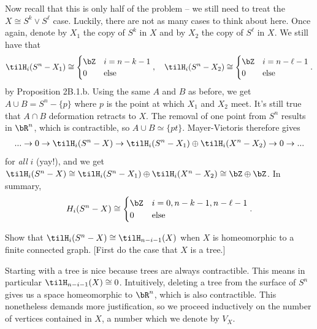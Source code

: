 \begin{homework}[e]
\begin{prf}
    Now recall that this is only half of the problem -- we still need to treat the $X \cong S^k \vee S^\ell$ case. Luckily, there are not as many cases to think about here. Once again, denote by $X_1$ the copy of $S^k$ in $X$ and by $X_2$ the copy of $S^{\ell}$ in $X$. We still have that
    \begin{align*}
      \tilH_i(S^n - X_1) \cong
      \begin{cases}
        \bZ & i = n - k - 1 \\
        0 & \text{else}
      \end{cases}, \hspace{1em}
      \tilH_i(S^n - X_2) \cong
      \begin{cases}
        \bZ & i = n - \ell - 1 \\
        0 & \text{else}
      \end{cases}.
    \end{align*}
    by Proposition 2B.1.b. Using the same $A$ and $B$ as before, we get $A\cup B = S^n - \{p\}$ where $p$ is the point at which $X_1$ and $X_2$ meet. It's still true that $A \cap B$ deformation retracts to $X$. The removal of one point from $S^n$ results in $\bR^n$, which is contractible, so $A \cup B \simeq \{pt\}$. Mayer-Vietoris therefore gives
    \begin{align*}
      ... \to 0 \to \tilH_i(S^n - X) \to \tilH_i(S^n - X_1) \oplus \tilH_i(X^n - X_2) \to 0 \to ...
    \end{align*}
    for \emph{all} $i$ (yay!), and we get $\tilH_i(S^n - X) \cong \tilH_i(S^n - X_1) \oplus \tilH_i(X^n - X_2) \cong \bZ \oplus \bZ$. In summary,
    \begin{align*}
      H_i(S^n - X) \cong
      \begin{cases}
        \bZ & i = 0, n - k - 1, n - \ell - 1 \\
        0 & \text{else}
      \end{cases}.
    \end{align*}
  \end{prf}
   Show that $\tilH_i(S^n - X) \cong \tilH_{n - i - 1}(X)$ when $X$ is homeomorphic to a finite connected graph. [First do the case that $X$ is a tree.]
  \begin{prf}
    Starting with a tree is nice because trees are always contractible. This means in particular $\tilH_{n - i - 1}(X) \cong 0$. Intuitively, deleting a tree from the surface of $S^n$ gives us a space homeomorphic to $\bR^n$, which is also contractible. This nonetheless demands more justification, so we proceed inductively on the number of vertices contained in $X$, a number which we denote by $V_X$. 


\end{prf}
\end{homework}
